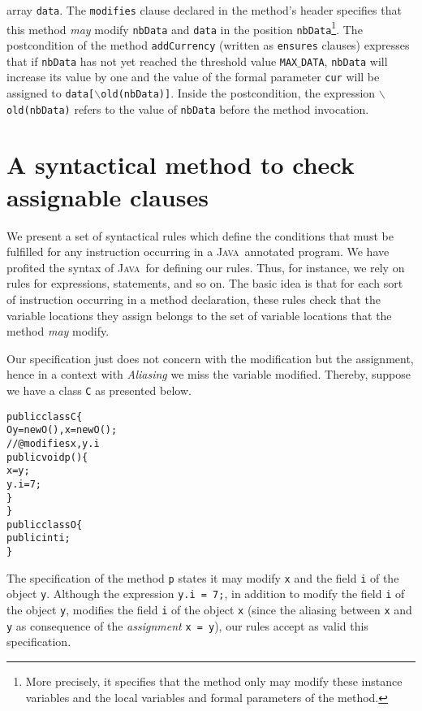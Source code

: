 \documentclass[a4paper]{llncs}
\newcommand{\java}{\textsc{Java}}
\begin{document}
array \texttt{data}. The \texttt{modifies} clause declared in the 
method's header specifies that 
this method \emph{may} modify \texttt{nbData} and 
\texttt{data} in the position \texttt{nbData}\footnote{More precisely,
it specifies that the method only may modify these instance variables
and the local variables and formal parameters of the method.}. The
postcondition of the method \texttt{addCurrency} (written as 
\texttt{ensures} clauses) expresses that if \texttt{nbData} has not 
yet reached the threshold value \texttt{MAX$\_$DATA}, \texttt{nbData} 
will increase its value by one and the value of the formal parameter 
\texttt{cur} will be assigned to \texttt{data[\(\backslash\)old(nbData)]}.  
Inside the postcondition, the expression 
\texttt{$\backslash$old(nbData)} refers to the value of 
\texttt{nbData} before the method invocation. 






\section{A syntactical method to check assignable clauses}
\label{sec-syn-met-che-ass-cla}
We present a set of syntactical rules which define the conditions that
must be fulfilled for any instruction occurring in a
\java~annotated program. We have profited the syntax of \java~for
defining our rules. Thus, for instance, we rely on rules for
expressions, statements, and so on. The basic idea is that for each
sort of instruction occurring in a method
declaration, these rules check that the variable locations they assign
belongs to the set of variable locations that the
method \emph{may} modify.

Our specification just does not concern with the modification but the
assignment, hence in a context with \emph{Aliasing} we miss the
variable modified. Thereby, suppose we have a class \texttt{C} as
presented below. 
\begin{alltt}
public class C\verb!{!
  O y = new O(), x = new O();    
  //@modifies x, y.i
  public void p()\verb!{!
     x = y ;
     y.i = 7;
  \verb!}!    
\verb!}!
public class O\verb!{!
  public int i;
\verb!}!
\end{alltt}
The specification of the method \texttt{p} states it may modify
\texttt{x} and
the field \texttt{i} of the object \texttt{y}. Although the expression 
\texttt{y.i = 7;}, in addition to modify the field \texttt{i} of the
object \texttt{y}, modifies the field \texttt{i} of the object
\texttt{x} (since the aliasing between \texttt{x} and \texttt{y} as
consequence of the \emph{assignment} \texttt{x = y}), our rules
accept as valid this specification.
\end{document}
